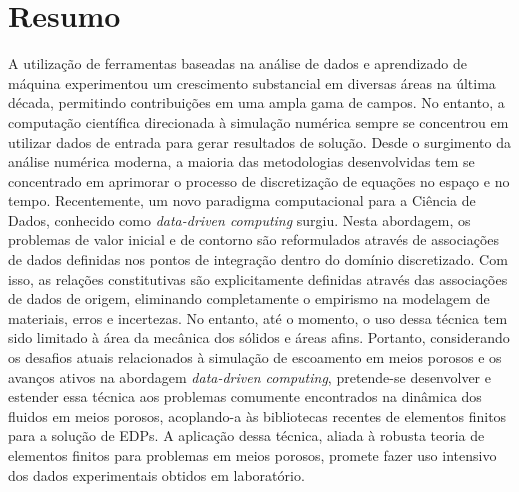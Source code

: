 \section{Resumo}

	A utilização de ferramentas baseadas na análise de dados e aprendizado de máquina experimentou um crescimento substancial em diversas áreas na última década, permitindo contribuições em uma ampla gama de campos. No entanto, a computação científica direcionada à simulação numérica sempre se concentrou em utilizar dados de entrada para gerar resultados de solução. Desde o surgimento da análise numérica moderna, a maioria das metodologias desenvolvidas tem se concentrado em aprimorar o processo de discretização de equações no espaço e no tempo. Recentemente, um novo paradigma computacional para a Ciência de Dados, conhecido como \textit{data-driven computing} surgiu. Nesta abordagem, os problemas de valor inicial e de contorno são reformulados através de associações de dados definidas nos pontos de integração dentro do domínio discretizado. Com isso, as relações constitutivas são explicitamente definidas através das associações de dados de origem, eliminando completamente o empirismo na modelagem de materiais, erros e incertezas. No entanto, até o momento, o uso dessa técnica tem sido limitado à área da mecânica dos sólidos e áreas afins. Portanto, considerando os desafios atuais relacionados à simulação de escoamento em meios porosos e os avanços ativos na abordagem \textit{data-driven computing}, pretende-se desenvolver e estender essa técnica aos problemas comumente encontrados na dinâmica dos fluidos em meios porosos, acoplando-a às bibliotecas recentes de elementos finitos para a solução de EDPs. A aplicação dessa técnica, aliada à robusta teoria de elementos finitos para problemas em meios porosos, promete fazer uso intensivo dos dados experimentais obtidos em laboratório.
	
	
	
	
	
	